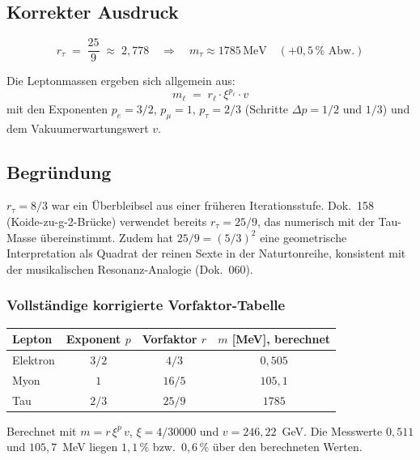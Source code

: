 \subsection*{Korrekter Ausdruck}

\begin{equation}
  \boxed{r_\tau \;=\; \frac{25}{9} \;\approx\; 2{,}778}
  \quad \Rightarrow \quad
  m_\tau \approx 1785\,\text{MeV} \quad (+0{,}5\,\% \text{ Abw.})
  \tag{186.2}
\end{equation}

Die Leptonmassen ergeben sich allgemein aus:
\begin{equation}
  m_\ell \;=\; r_\ell \cdot \xi^{p_\ell} \cdot v
  \tag{186.3}
\end{equation}
mit den Exponenten $p_e = 3/2$, $p_\mu = 1$, $p_\tau = 2/3$
(Schritte $\Delta p = 1/2$ und $1/3$) und dem Vakuumerwartungswert $v$.

\subsection*{Begründung}

$r_\tau = 8/3$ war ein Überbleibsel aus einer früheren Iterationsstufe.
Dok.~158 (Koide-zu-g-2-Brücke) verwendet bereits $r_\tau = 25/9$, das
numerisch mit der Tau-Masse übereinstimmt. Zudem hat $25/9 = (5/3)^2$
eine geometrische Interpretation als Quadrat der reinen Sexte in der
Naturtonreihe, konsistent mit der musikalischen Resonanz-Analogie
(Dok.~060).

\subsubsection*{Vollständige korrigierte Vorfaktor-Tabelle}

\begin{center}
\begin{tabular}{lccc}
\hline
\textbf{Lepton} & \textbf{Exponent $p$} & \textbf{Vorfaktor $r$} & \textbf{$m$ [MeV], berechnet}\\
\hline
Elektron   & $3/2$  & $4/3$   & $0{,}505$ \\
Myon       & $1$    & $16/5$  & $105{,}1$ \\
Tau        & $2/3$  & $25/9$  & $1785$    \\
\hline
\end{tabular}
\end{center}
Berechnet mit $m = r\,\xi^p\,v$, $\xi = 4/30000$ und $v = 246{,}22$~GeV. Die Messwerte $0{,}511$ und $105{,}7$~MeV liegen $1{,}1\,\%$ bzw.\ $0{,}6\,\%$ über den berechneten Werten.

